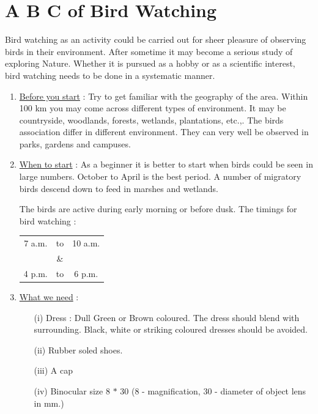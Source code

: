 \vfill\eject

\setcounter{chapter}{4}
\chapter{A B C of Bird Watching}%

Bird watching as an activity could be carried out for sheer 
pleasure of observing birds in their environment. After sometime 
it may become a serious study of exploring Nature. Whether it is 
pursued as a hobby or as a scientific interest, bird watching 
needs to be done in a systematic manner. 
\begin{enumerate}
\item \underline{Before you start} : Try to get familiar with the geography of 
the area. Within 100 km you may come across different types 
of environment. It may be countryside, woodlands, forests, 
wetlands, plantations, etc.,. The birds association differ 
in different environment. They can very well be observed in 
parks, gardens and campuses. 

\item \underline{When to start} : As a beginner it is better to start when 
birds could be seen in large numbers. October to April is 
the best period. A number of migratory birds descend down to 
feed in marshes and wetlands. 

The birds are active during early morning or before 
dusk. The timings for bird watching : 
\begin{center}
\begin{tabular}{ccc}
7 a.m. & to & 10 a.m. \\
& \& & \\
4 p.m. & to & 6 p.m.
\end{tabular}
\end{center}

\item \underline{What we need} :
\begin{itemize}
\item[(i)] Dress : Dull Green or Brown coloured. The dress should 
blend with surrounding. Black, white or striking coloured 
dresses should be avoided. 

\item[(ii)] Rubber soled shoes. 

\item[(iii)] A cap 

\item[(iv)] Binocular size 8 $\ast$ 30 (8 - magnification, 30 - diameter 
of object lens in mm.) 


\end{itemize}
\end{enumerate}
